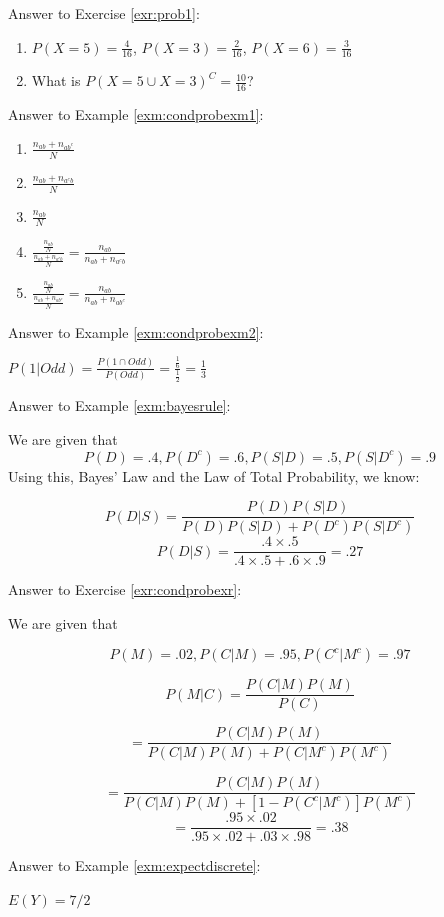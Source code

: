 \documentclass[
]{book}
\theoremstyle{definition}
\theoremstyle{definition}
\theoremstyle{definition}
\theoremstyle{definition}
\theoremstyle{remark}
\begin{document}
Answer to Exercise \ref{exr:prob1}:

\begin{enumerate}
\def\labelenumi{\arabic{enumi}.}
\item
  \(P(X = 5) = \frac{4}{16}\), \(P(X = 3) = \frac{2}{16}\), \(P(X = 6) = \frac{3}{16}\)
\item
  What is \(P(X=5 \cup X = 3)^C = \frac{10}{16}\)?
\end{enumerate}

Answer to Example \ref{exm:condprobexm1}:

\begin{enumerate}
\def\labelenumi{\arabic{enumi}.}
\item
  \(\frac{n_{ab} + n_{ab^c}}{N}\)
\item
  \(\frac{n_{ab} + n_{a^cb}}{N}\)
\item
  \(\frac{n_{ab}}{N}\)
\item
  \(\frac{\frac{n_{ab}}{N}}{\frac{n_{ab} + n_{a^cb}}{N}} = \frac{n_{ab}}{n_{ab} + n_{a^cb}}\)
\item
  \(\frac{\frac{n_{ab}}{N}}{\frac{n_{ab} + n_{ab^c}}{N}} = \frac{n_{ab}}{n_{ab} + n_{ab^c}}\)
\end{enumerate}

Answer to Example \ref{exm:condprobexm2}:

\(P(1|Odd) = \frac{P(1 \cap Odd)}{P(Odd)} = \frac{\frac{1}{6}}{\frac{1}{2}} = \frac{1}{3}\)

Answer to Example \ref{exm:bayesrule}:

We are given that
\[P(D) = .4, P(D^c) = .6, P(S|D) = .5, P(S|D^c) = .9\]
Using this, Bayes' Law and the Law of Total Probability, we know:

\[P(D|S) = \frac{P(D)P(S|D)}{P(D)P(S|D) + P(D^c)P(S|D^c)}\]
\[P(D|S) = \frac{.4 \times .5}{.4 \times .5 + .6 \times .9 } = .27\]

Answer to Exercise \ref{exr:condprobexr}:

We are given that

\[P(M) = .02, P(C|M) = .95, P(C^c|M^c) = .97\]

\[P(M|C) = \frac{P(C|M)P(M)}{P(C)}\]

\[= \frac{P(C|M)P(M)}{P(C|M)P(M) + P(C|M^c)P(M^c)}\]

\[= \frac{P(C|M)P(M)}{P(C|M)P(M) + [1-P(C^c|M^c)]P(M^c)}\]
\[ = \frac{.95 \times .02}{.95 \times .02 + .03 \times .98} = .38\]

Answer to Example \ref{exm:expectdiscrete}:

\(E(Y)=7/2\)
\end{document}
